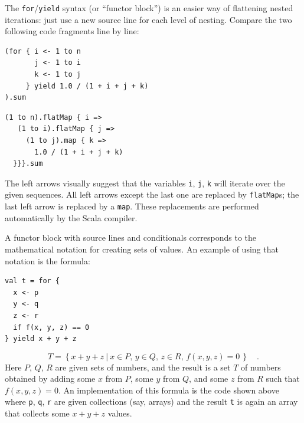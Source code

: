 The \lstinline!for!/\lstinline!yield! syntax (or \textsf{``}functor block\textsf{''})
is an easier way of flattening nested iterations: just use a new source
line for each level of nesting. Compare the two following code fragments
line by line:

\noindent \texttt{\textcolor{blue}{\footnotesize{}}}%
\begin{minipage}[c]{0.475\columnwidth}%
\texttt{\textcolor{blue}{\footnotesize{}}}
\begin{lstlisting}
(for { i <- 1 to n
       j <- 1 to i
       k <- 1 to j
     } yield 1.0 / (1 + i + j + k)
).sum
\end{lstlisting}
%
\end{minipage}\texttt{\textcolor{blue}{\footnotesize{}\hspace*{\fill}}}%
\begin{minipage}[c]{0.475\columnwidth}%
\texttt{\textcolor{blue}{\footnotesize{}}}
\begin{lstlisting}
(1 to n).flatMap { i =>
   (1 to i).flatMap { j =>
     (1 to j).map { k =>
       1.0 / (1 + i + j + k)
  }}}.sum
\end{lstlisting}
%
\end{minipage}{\footnotesize\par}

\vspace{0.2\baselineskip}
The left arrows visually suggest that the variables \lstinline!i!,
\lstinline!j!, \lstinline!k! will iterate over the given sequences.
All left arrows except the last one are replaced by \lstinline!flatMap!s;
the last left arrow is replaced by a \lstinline!map!. These replacements
are performed automatically by the Scala compiler.

A functor block with source lines and conditionals corresponds to
the mathematical notation for creating sets of values. An example
of using that notation is the formula:
\begin{lstlisting}
val t = for {
  x <- p
  y <- q
  z <- r
  if f(x, y, z) == 0
} yield x + y + z
\end{lstlisting}
\[
T=\left\{ \left.x+y+z~\right|~x\in P,\,y\in Q,\,z\in R,\,f(x,y,z)=0\,\right\} \quad.
\]
Here $P$, $Q$, $R$ are given sets of numbers, and the result is
a set $T$ of numbers obtained by adding some $x$ from $P$, some
$y$ from $Q$, and some $z$ from $R$ such that $f(x,y,z)=0$. An
implementation of this formula is the code shown above where \lstinline!p!,
\lstinline!q!, \lstinline!r! are given collections (say, arrays)
and the result \lstinline!t! is again an array that collects some
$x+y+z$ values.

